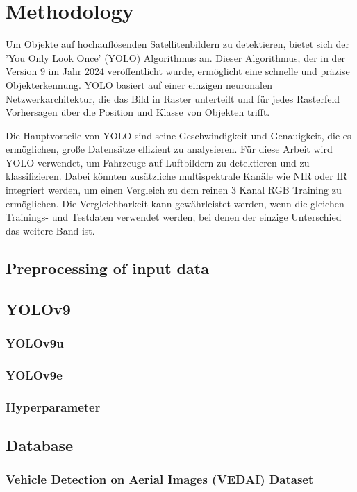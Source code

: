 \chapter{Methodology}
\label{ch:methodology}

Um Objekte auf hochauflösenden Satellitenbildern zu detektieren, bietet sich der 'You Only Look Once' (YOLO) Algorithmus an. Dieser Algorithmus, der in der Version 9 im Jahr 2024 veröffentlicht wurde, ermöglicht eine schnelle und präzise Objekterkennung. YOLO basiert auf einer einzigen neuronalen Netzwerkarchitektur, die das Bild in Raster unterteilt und für jedes Rasterfeld Vorhersagen über die Position und Klasse von Objekten trifft. 

Die Hauptvorteile von YOLO sind seine Geschwindigkeit und Genauigkeit, die es ermöglichen, große Datensätze effizient zu analysieren. Für diese Arbeit wird YOLO verwendet, um Fahrzeuge auf Luftbildern zu detektieren und zu klassifizieren. Dabei könnten zusätzliche multispektrale Kanäle wie NIR oder IR integriert werden, um einen Vergleich zu dem reinen 3 Kanal RGB Training zu ermöglichen. Die Vergleichbarkeit kann gewährleistet werden, wenn die gleichen Trainings- und Testdaten verwendet werden, bei denen der einzige Unterschied das weitere Band ist.

\section{Preprocessing of input data}
\section{YOLOv9}
\subsection{YOLOv9u}
\subsection{YOLOv9e}
\subsection{Hyperparameter}

\section{Database}
\subsection{Vehicle Detection on Aerial Images (VEDAI) Dataset}

